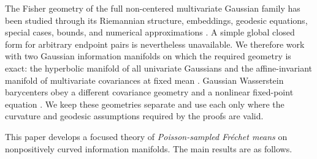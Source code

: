 \documentclass[11pt,a4paper]{article}
\theoremstyle{remark}
\begin{document}
The Fisher geometry of the full non-centered multivariate Gaussian family has been studied through its Riemannian structure, embeddings, geodesic equations, special cases, bounds, and numerical approximations \cite{skovgaard1984,calvo1990,calvo1991,kobayashi2023,nielsen2023,pinele2020,miyamoto2024}.  A simple global closed form for arbitrary endpoint pairs is nevertheless unavailable.  We therefore work with two Gaussian information manifolds on which the required geometry is exact: the hyperbolic manifold of all univariate Gaussians and the affine-invariant manifold of multivariate covariances at fixed mean \cite{amari2000,costa2015,bhatia2007,moakher2005}.  Gaussian Wasserstein barycenters obey a different covariance geometry and a nonlinear fixed-point equation \cite{takatsu2011,malago2018,alvarez2016}.  We keep these geometries separate and use each only where the curvature and geodesic assumptions required by the proofs are valid.

This paper develops a focused theory of \emph{Poisson-sampled Fr\'echet means} on nonpositively curved information manifolds.  The main results are as follows.
\end{document}
